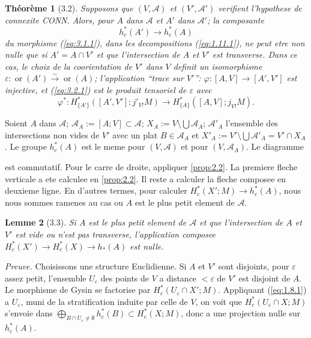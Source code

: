 \documentclass[11pt,a4paper]{article}
\theoremstyle{plain}
\newtheorem{theorem}{Th\'eor\`eme}[section]
\newtheorem{lemma}[theorem]{Lemme}
\theoremstyle{definition}
\newcommand{\ori}{\operatorname{or}}
\begin{document}
\begin{theorem}[3.2]\label{thm:3.2}
Supposons que $(V,\mathcal{A})$ et $(V',\mathcal{A}')$ verifient l'hypothese de connexite CONN. Alors, pour $A$ dans $\mathcal{A}$ et $A'$ dans $\mathcal{A}'$; la composante
\begin{equation}\label{eq:3.2.1}
h^*_c(A') \longrightarrow h^*_c(A)
\tag{3.2.1}
\end{equation}
du morphisme (\ref{eq:3.1.1}), dans les decompositions (\ref{eq:1.11.1}), ne peut etre non nulle que si $A' = A \cap V'$ et que l'intersection de $A$ et $V'$ est transverse. Dans ce cas, le choix de la coorientation de $V'$ dans $V$ definit un isomorphisme $\varepsilon: \ori(A') \xrightarrow{\sim} \ori(A)$; l'application ``trace sur $V'$'': $\varphi: [A,V] \to [A',V']$ est injective, et (\ref{eq:3.2.1}) est le produit tensoriel de $\varepsilon$ avec
\begin{equation}\label{eq:3.2.2}
\varphi^*: H^*_{\{A'\}}([A',V'];j'_{V!}M) \longrightarrow H^*_{\{A\}}([A,V];j_{V!}M).
\tag{3.2.2}
\end{equation}
\end{theorem}

Soient $A$ dans $\mathcal{A}$; $\mathcal{A}_A := [A;V] \subset \mathcal{A}$; $X_A := V \setminus \bigcup\mathcal{A}_A$; $\mathcal{A}'_A$ l'ensemble des intersections non vides de $V'$ avec un plat $B \in \mathcal{A}_A$ et $X'_A := V' \setminus \bigcup\mathcal{A}'_A = V' \cap X_A$. Le groupe $h^*_c(A)$ est le meme pour $(V,\mathcal{A})$ et pour $(V,\mathcal{A}_A)$. Le diagramme
est commutatif. Pour le carre de droite, appliquer \ref{prop:2.2}. La premiere fleche verticale a ete calculee en \ref{prop:2.2}. Il reste a calculer la fleche composee en deuxieme ligne. En d'autres termes, pour calculer $H^*_c(X';M) \to h^*_c(A)$, nous nous sommes ramenes au cas ou $A$ est le plus petit element de $\mathcal{A}$.

\begin{lemma}[3.3]\label{lem:3.3}
Si $A$ est le plus petit element de $\mathcal{A}$ et que l'intersection de $A$ et $V'$ est vide ou n'est pas transverse, l'application composee $H^*_c(X') \to H^*_c(X) \to h_*(A)$ est nulle.
\end{lemma}

\noindent\textit{Preuve.} Choisissons une structure Euclidienne. Si $A$ et $V'$ sont disjoints, pour $\varepsilon$ assez petit, l'ensemble $U_\varepsilon$ des points de $V$ a distance $<\varepsilon$ de $V'$ est disjoint de $A$. Le morphisme de Gysin se factorise par $H^*_c(U_\varepsilon \cap X';M)$. Appliquant (\ref{eq:1.8.1}) a $U_\varepsilon$, muni de la stratification induite par celle de $V$, on voit que $H^*_c(U_\varepsilon \cap X;M)$ s'envoie dans $\bigoplus_{B \cap U_\varepsilon \neq \emptyset} h^*_c(B) \subset H^*_c(X;M)$, donc a une projection nulle sur $h^*_c(A)$.
\end{document}
